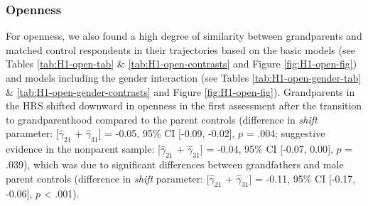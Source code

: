 \documentclass[
  english,
  man, noextraspace]{apa7}
\begin{document}
\hypertarget{openness}{%
\subsubsection{Openness}\label{openness}}

For openness, we also found a high degree of similarity between grandparents and matched control respondents in their trajectories based on the basic models (see Tables \ref{tab:H1-open-tab} \& \ref{tab:H1-open-contrasts} and Figure \ref{fig:H1-open-fig}) and models including the gender interaction (see Tables \ref{tab:H1-open-gender-tab} \& \ref{tab:H1-open-gender-contrasts} and Figure \ref{fig:H1-open-fig}). Grandparents in the HRS shifted downward in openness in the first assessment after the transition to grandparenthood compared to the parent controls (difference in \emph{shift} parameter: {[}\(\hat{\gamma}_{21}\) + \(\hat{\gamma}_{31}\){]} = -0.05, 95\% CI {[}-0.09, -0.02{]}, \(p\) = .004; suggestive evidence in the nonparent sample: {[}\(\hat{\gamma}_{21}\) + \(\hat{\gamma}_{31}\){]} = -0.04, 95\% CI {[}-0.07, 0.00{]}, \(p\) = .039), which was due to significant differences between grandfathers and male parent controls (difference in \emph{shift} parameter: {[}\(\hat{\gamma}_{21}\) + \(\hat{\gamma}_{31}\){]} = -0.11, 95\% CI {[}-0.17, -0.06{]}, \(p\) \textless{} .001).\\
\end{document}
